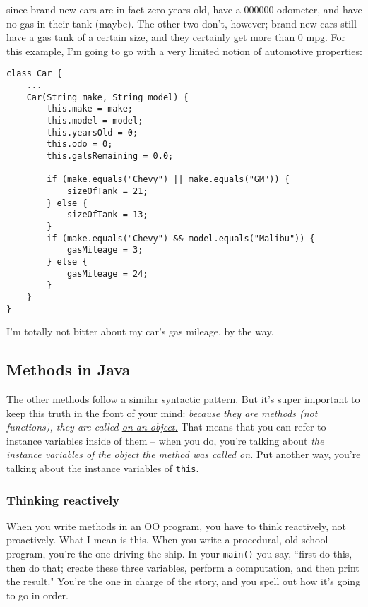 since brand new cars are in fact zero years old, have a 000000 odometer, and
have no gas in their tank (maybe). The other two don't, however; brand new
cars still have a gas tank of a certain size, and they certainly get more than
0 mpg. For this example, I'm going to go with a very limited notion of
automotive properties:

\begin{Verbatim}[samepage=true,fontsize=\footnotesize,frame=single]
class Car {
    ...
    Car(String make, String model) {
        this.make = make;
        this.model = model;
        this.yearsOld = 0;
        this.odo = 0;
        this.galsRemaining = 0.0;
        
        if (make.equals("Chevy") || make.equals("GM")) {
            sizeOfTank = 21;
        } else {
            sizeOfTank = 13;
        }
        if (make.equals("Chevy") && model.equals("Malibu")) {
            gasMileage = 3;
        } else {
            gasMileage = 24;
        }
    }
}
\end{Verbatim}

I'm totally not bitter about my car's gas mileage, by the way.

\subsection{Methods in Java}

The other methods follow a similar syntactic pattern. But it's super important
to keep this truth in the front of your mind: \textit{because they are methods
(not functions), they are called \underline{on an object.}} That means that
you can refer to instance variables inside of them -- when you do, you're
talking about \textit{the instance variables of the object the method was
called on.} Put another way, you're talking about the instance variables of
\texttt{this}.

\subsubsection{Thinking reactively}

When you write methods in an OO program, you have to think reactively, not
proactively. What I mean is this. When you write a procedural, old school
program, you're the one driving the ship. In your \texttt{main()} you say,
``first do this, then do that; create these three variables, perform a
computation, and then print the result." You're the one in charge of the
story, and you spell out how it's going to go in order.

